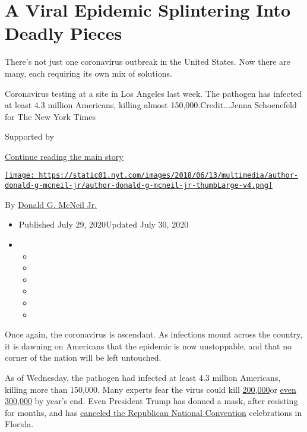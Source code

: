 \hypertarget{a-viral-epidemic-splintering-into-deadly-pieces}{%
\section{A Viral Epidemic Splintering Into Deadly
Pieces}\label{a-viral-epidemic-splintering-into-deadly-pieces}}

There's not just one coronavirus outbreak in the United States. Now
there are many, each requiring its own mix of solutions.

Coronavirus testing at a site in Los Angeles last week. The pathogen has
infected at least 4.3 million Americans, killing almost
150,000.Credit...Jenna Schoenefeld for The New York Times

Supported by

\protect\hyperlink{after-sponsor}{Continue reading the main story}

\href{https://www.nytimes.com/by/donald-g-mcneil-jr}{\texttt{[image: https://static01.nyt.com/images/2018/06/13/multimedia/author-donald-g-mcneil-jr/author-donald-g-mcneil-jr-thumbLarge-v4.png]}}

By \href{https://www.nytimes.com/by/donald-g-mcneil-jr}{Donald G. McNeil
Jr.}

\begin{itemize}
\item
  Published July 29, 2020Updated July 30, 2020
\item
  \begin{itemize}
  \item
  \item
  \item
  \item
  \item
  \item
  \end{itemize}
\end{itemize}

Once again, the coronavirus is ascendant. As infections mount across the
country, it is dawning on Americans that the epidemic is now
unstoppable, and that no corner of the nation will be left untouched.

As of Wednesday, the pathogen had infected at least 4.3 million
Americans, killing more than 150,000. Many experts fear the virus could
kill
\href{https://www.forbes.com/sites/mattperez/2020/07/07/imhe-model-projects-208255-us-deaths-by-november-but-estimate-falls-sharply-if-mask-use-increases/\#3c8ee9616f2e}{200,000}or
\href{https://www.cnbc.com/2020/07/22/dr-scott-gottlieb-us-coronavirus-deaths-may-hit-300000-by-year-end.html}{even
300,000} by year's end. Even President Trump has donned a mask, after
resisting for months, and has
\href{https://www.nytimes.com/2020/07/23/us/politics/jacksonville-rnc.html}{canceled
the Republican National Convention} celebrations in Florida.

